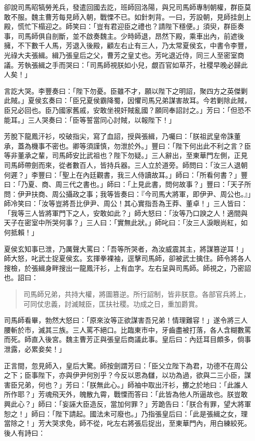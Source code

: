 卻說司馬昭犒勞羌兵，發遣回國去訖，班師回洛陽，與兄司馬師專制朝權，群臣莫敢不服。魏主曹芳每見師入朝，戰慄不已。如針刺背。一曰，芳設朝，見師挂劍上殿，慌忙下榻迎之。師笑曰：「豈有君迎臣之禮也？請陛下穩便。」須臾，群臣奏事，司馬師俱自剖斷，並不啟奏魏主。少時師退，昂然下殿，乘車出內，前遮後擁，不下數千人馬，芳退入後殿，顧左右止有三人，乃太常夏侯玄，中書令李豐，光祿大夫張緝。緝乃張皇后之父，曹芳之皇丈也。芳叱退近侍，同三人至密室商議。芳執張緝之手而哭曰：「司馬師視朕如小兒，覷百官如草芥，社稷早晚必歸此人矣！」

言訖大哭。李豐奏曰：「陛下勿憂。臣雖不才，願以陛下之明詔，聚四方之英傑剿此賊。」夏侯玄奏曰：「臣兄夏侯霸降蜀，因懼司馬兄弟謀害故耳。今若剿除此賊，臣兄必回也。臣乃國家舊戚，安敢坐視奸賊亂國？願同奉詔討之。」芳曰：「但恐不能耳。」三人哭奏曰：「臣等誓當同心討賊，以報陛下！」

芳脫下龍鳳汗衫，咬破指尖，寫了血詔，授與張緝，乃囑曰：「朕祖武皇帝誅董承，蓋為機事不密也。卿等須謹慎，勿泄於外。」豐曰：「陛下何出此不利之言？臣等非董承之輩，司馬師安比武祖也？陛下勿疑。」三人辭出，至東華門左側，正見司馬師帶劍而來，從者數百人，皆持兵器。三人立於道旁。師問曰：「汝三人退朝何遲？」李豐曰：「聖上在內廷觀書，我三人侍讀故耳。」師曰：「所看何書？」豐曰：「乃夏、商、周三代之書也。」師曰：「上見此書，問何故事？」豐曰：「天子所問：伊尹扶商、周公攝政之事；我等皆奏曰：『今司馬大將軍，即伊尹、周公也。』」師冷笑曰：「汝等豈將吾比伊尹、周公！其心實指吾為王莽、董卓！」三人皆曰：「我等三人皆將軍門下之人，安敢如此？」師大怒曰：「汝等乃口諛之人！適間與天子在密室中所哭何事？」三人曰：「實無此狀。」師叱曰：「汝三人淚眼尚紅，如何抵賴！」

夏侯玄知事已泄，乃厲聲大罵曰：「吾等所哭者，為汝威震其主，將謀篡逆耳！」師大怒，叱武士捉夏侯玄。玄揮拳裸袖，逕擊司馬師，卻被武士擒住。師令將各人搜檢，於張緝身畔搜出一龍鳳汗衫，上有血字。左右呈與司馬師。師視之，乃密詔也。詔曰：

\begin{quote}
司馬師兄弟，共持大權，將圖篡逆。所行詔制，皆非朕意。各部官兵將上，可同仗忠義，討滅賊臣，匡扶社稷。功成之日，重加爵賞。
\end{quote}

司馬師看畢，勃然大怒曰：「原來汝等正欲謀害吾兄弟！情理難容！」遂令將三人腰斬於市，滅其三族。三人罵不絕口。比臨東市中，牙齒盡被打落，各人含糊數罵而死。師直入後宮。魏主曹芳正與張皇后商議此事。皇后曰：內廷耳目頗多，倘事泄露，必累妾矣！」

正言間，忽見師入，皇后大驚。師按劍謂芳曰：「臣父立陛下為君，功德不在周公之下；臣事陛下，亦與伊尹何別乎？今反以恩為讎，以功為過，欲與二三小臣，謀害臣兄弟，何也？」芳曰：「朕無此心。」師袖中取出汗衫，擲之於地曰：「此誰人所作耶？」芳魂飛天外，魄散九霄，戰慄而答曰：「此皆為他人所逼故也。朕豈敢興此心？」師曰：「妄誣大臣造反，當加何罪？」芳跪告曰：「朕合有罪，望大將軍恕之！」師曰：「陛下請起。國法未可廢也。」乃指張皇后曰：「此是張緝之女，理當除之！」芳大哭求免，師不從，叱左右將張后捉出，至東華門內，用白練絞死。後人有詩曰：


